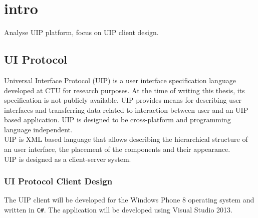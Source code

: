 \chapter{intro}
Analyse UIP platform, focus on UIP client design.
\section{UI Protocol}
Universal Interface Protocol (UIP) is a user interface specification language developed at CTU for research purposes. At the time of writing this thesis, its specification is not publicly available. UIP provides means for describing user interfaces and transferring data related to interaction between user and an UIP based application. UIP is designed to be cross-platform and  programming language independent.\\
UIP is XML based language that allows describing the hierarchical structure of an user interface, the placement of the components and their appearance.\\
UIP is designed as a client-server system. 

\subsection{UI Protocol Client Design}
The  UIP client will be developed for the Windows Phone 8 operating system and written in \texttt{C\#}. The application will be developed using Visual Studio 2013. 
\endinput